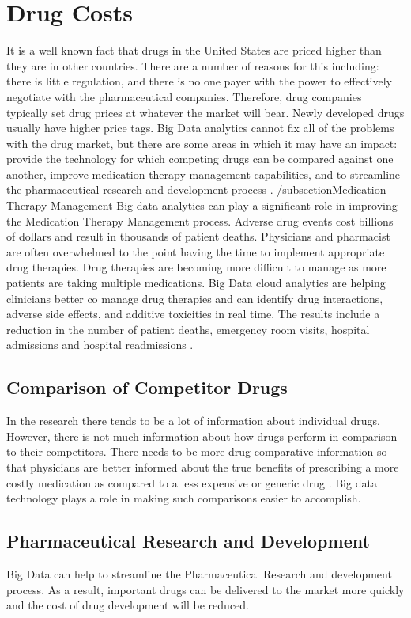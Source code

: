 \documentclass[sigconf]{acmart}
\begin{document}
\section{Drug Costs}
It is a well known fact that drugs in the United States are priced higher than they are in other countries.  There are a number of reasons for this including: there is little regulation, and there is no one payer with the power to effectively negotiate with the pharmaceutical companies. Therefore, drug companies typically set drug prices at whatever the market will bear.  Newly developed drugs usually have higher price tags.  Big Data analytics cannot fix all of the problems with the drug market, but there are some areas in which it may have an impact:  provide the technology for which competing drugs can be compared against one another, improve medication therapy management capabilities, and to streamline the pharmaceutical research and development process \cite{www-google-drug}.
/subsection{Medication Therapy Management}
Big data analytics can play a significant role in improving the Medication Therapy Management process.  Adverse drug events cost billions of dollars and result in thousands of patient deaths.  Physicians and pharmacist are often overwhelmed to the point having the time to implement appropriate drug therapies. Drug therapies are becoming more difficult to manage as more patients are taking multiple medications.  Big Data cloud analytics are helping clinicians better co manage drug therapies and can identify drug interactions, adverse side effects, and additive toxicities in real time. The results include a  reduction in the number of patient deaths, emergency room visits, hospital admissions and hospital readmissions \cite{datafloq}.
\subsection{Comparison of Competitor Drugs}
In the research there tends to be a lot of information about individual drugs. However, there is not much information about how drugs perform in comparison to their competitors.  There needs to be more drug comparative information so that physicians are better informed about the true benefits of prescribing a more costly medication as compared to a less expensive or generic drug \cite{www-google-drug}. Big data technology plays a role in making such comparisons easier to accomplish. 
\subsection{Pharmaceutical Research and Development}
Big Data can help to streamline the Pharmaceutical Research and development process. As a result, important drugs can be delivered to the market more quickly and the cost of drug development will be reduced.
\end{document}
